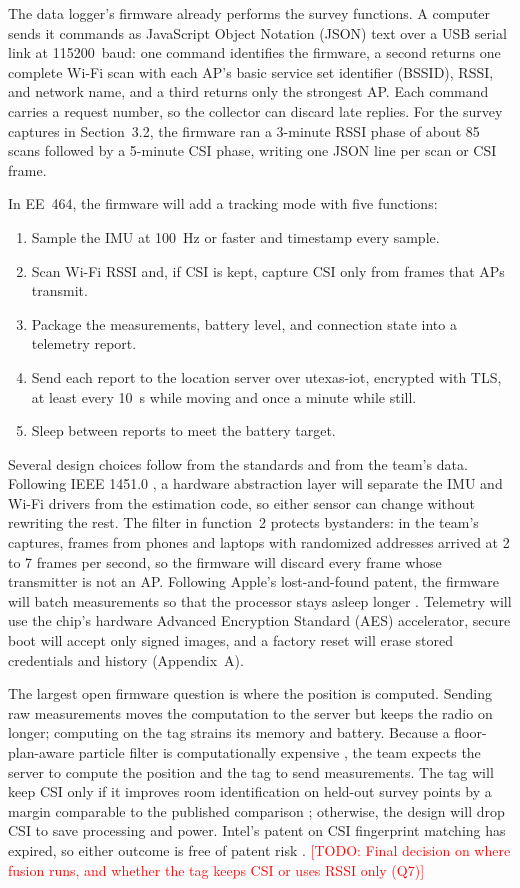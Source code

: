 \documentclass[12pt,letterpaper]{article}
\newcommand{\TODO}[1]{\textcolor{red}{[TODO: #1]}}
\begin{document}
The data logger's firmware already performs the survey functions. A computer sends it commands as
JavaScript Object Notation (JSON) text over a USB serial link at 115200~baud: one command identifies
the firmware, a second returns one complete Wi-Fi scan with each AP's basic service set identifier
(BSSID), RSSI, and network name, and a third returns only the strongest AP. Each command carries a
request number, so the collector can discard late replies. For the survey captures in Section~3.2,
the firmware ran a 3-minute RSSI phase of about 85 scans followed by a 5-minute CSI phase, writing
one JSON line per scan or CSI frame.

In EE~464, the firmware will add a tracking mode with five functions:
\begin{enumerate}
  \item Sample the IMU at 100~Hz or faster and timestamp every sample.
  \item Scan Wi-Fi RSSI and, if CSI is kept, capture CSI only from frames that APs transmit.
  \item Package the measurements, battery level, and connection state into a telemetry report.
  \item Send each report to the location server over utexas-iot, encrypted with TLS, at least every
    10~s while moving and once a minute while still.
  \item Sleep between reports to meet the battery target.
\end{enumerate}

Several design choices follow from the standards and from the team's data. Following IEEE 1451.0
\cite{std1451}, a hardware abstraction layer will separate the IMU and Wi-Fi drivers from the
estimation code, so either sensor can change without rewriting the rest. The filter in function~2
protects bystanders: in the team's captures, frames from phones and laptops with randomized
addresses arrived at 2 to 7 frames per second, so the firmware will discard every frame whose
transmitter is not an AP. Following Apple's lost-and-found patent, the firmware will batch
measurements so that the processor stays asleep longer \cite{apple}. Telemetry will use the chip's
hardware Advanced Encryption Standard (AES) accelerator, secure boot will accept only signed images,
and a factory reset will erase stored credentials and history (Appendix~A).

The largest open firmware question is where the position is computed. Sending raw measurements moves
the computation to the server but keeps the radio on longer; computing on the tag strains its memory
and battery. Because a floor-plan-aware particle filter is computationally expensive \cite{evennou},
the team expects the server to compute the position and the tag to send measurements. The tag will
keep CSI only if it improves room identification on held-out survey points by a margin comparable to
the published comparison \cite{deepfi}; otherwise, the design will drop CSI to save processing and
power. Intel's patent on CSI fingerprint matching has expired, so either outcome is free of patent
risk \cite{intel}. \TODO{Final
decision on where fusion runs, and whether the tag keeps CSI or uses RSSI only (Q7)}
\end{document}
